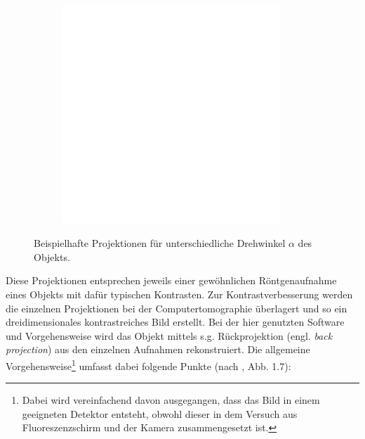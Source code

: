 \documentclass[11pt, a4paper]{article}
\numberwithin{equation}{section}
\begin{document}
\begin{figure}[ht]
\begin{subfigure}[c]{0.5\textwidth}
		\includegraphics[width=0.9\textwidth]{./figures/ct/Projection264.png}
	\end{subfigure}
	\caption{Beispielhafte Projektionen für unterschiedliche Drehwinkel $\alpha$ des Objekts.}
	\label{fig:ct_projektionen}
\end{figure}
Diese Projektionen entsprechen jeweils einer gewöhnlichen Röntgenaufnahme eines Objekts mit dafür typischen Kontrasten.
Zur Kontrastverbesserung werden die einzelnen Projektionen bei der Computertomographie überlagert und so ein dreidimensionales kontrastreiches Bild erstellt.
Bei der hier genutzten Software und Vorgehensweise wird das Objekt mittels s.g. Rückprojektion (engl. \emph{back projection}) aus den einzelnen Aufnahmen rekonstruiert.
Die allgemeine Vorgehensweise\footnote{Dabei wird vereinfachend davon ausgegangen, dass das Bild in einem geeigneten Detektor entsteht, obwohl dieser in dem Versuch aus Fluoreszenzschirm und der Kamera zusammengesetzt ist.} umfasst dabei folgende Punkte (nach \cite{kalender}, Abb. 1.7):
\end{document}
